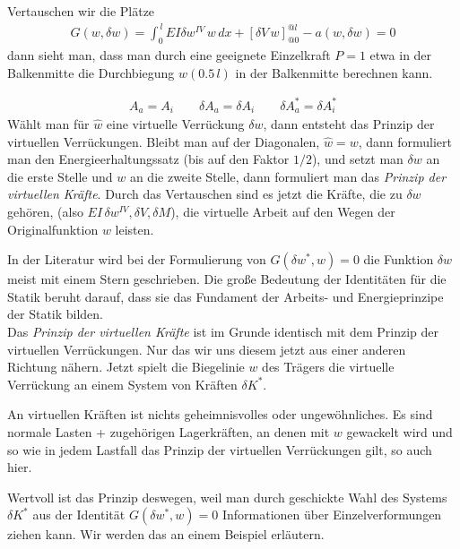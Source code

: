 Vertauschen wir die Pl\"{a}tze
\begin{align}
G(w, \delta w) = \int_0^{\,l} EI \delta w^{IV}\, w\,dx + [\delta V\, w]_{@0}^{@l} - a(w, \delta w) = 0
\end{align}
dann sieht man, dass man durch eine geeignete Einzelkraft $P = 1 $ etwa in der Balkenmitte die Durchbiegung $w(0.5\,l)$ in der Balkenmitte berechnen kann.

\begin{align} \label{Eq13}
A_a = A_i \qquad \delta A_a = \delta A_i \qquad \delta A_a^* = \delta A_i^*
\end{align}
W\"{a}hlt man f\"{u}r $\hat{w} $ eine virtuelle Verr\"{u}ckung $\delta w $, dann entsteht das Prinzip der virtuellen Verr\"{u}ckungen. Bleibt man auf der Diagonalen, $\hat{w} = w $, dann formuliert man den Energieerhaltungssatz (bis auf den Faktor $1/2$), und setzt man $\delta w $ an die erste Stelle und $w $ an die zweite Stelle, dann formuliert man das {\em Prinzip der virtuellen Kr\"{a}fte\/}. Durch das Vertauschen sind es jetzt die Kr\"{a}fte, die zu $\delta w $ geh\"{o}ren, (also $EI\,\delta w^{IV}, \delta V, \delta M$), die virtuelle Arbeit auf den Wegen der Originalfunktion $w $ leisten.

In der Literatur wird bei der Formulierung von $G(\delta w^*,w) = 0$ die Funktion $\delta w $ meist mit einem Stern geschrieben.
Die gro{\ss}e Bedeutung der Identit\"{a}ten f\"{u}r die Statik beruht darauf, dass sie das Fundament der Arbeits- und Energieprinzipe der Statik bilden. \\



Das {\em Prinzip der virtuellen Kr\"{a}fte\/} ist im Grunde identisch mit dem Prinzip der virtuellen Verr\"{u}ckungen. Nur das wir uns diesem jetzt aus einer anderen Richtung n\"{a}hern. Jetzt spielt die Biegelinie $w$ des Tr\"{a}gers die virtuelle Verr\"{u}ckung an einem System von Kr\"{a}ften $\delta K^*$.

An virtuellen Kr\"{a}ften ist nichts geheimnisvolles oder ungew\"{o}hnliches. Es sind normale Lasten + zugeh\"{o}rigen Lagerkr\"{a}ften, an denen mit $w$ gewackelt wird und so wie in jedem Lastfall das Prinzip der virtuellen Verr\"{u}ckungen gilt, so auch hier.

Wertvoll ist das Prinzip deswegen, weil man durch geschickte Wahl des Systems $\delta K^*$ aus der Identit\"{a}t $G(\delta w^*, w) = 0$ Informationen \"{u}ber Einzelverformungen ziehen kann. Wir werden das an einem Beispiel erl\"{a}utern.



